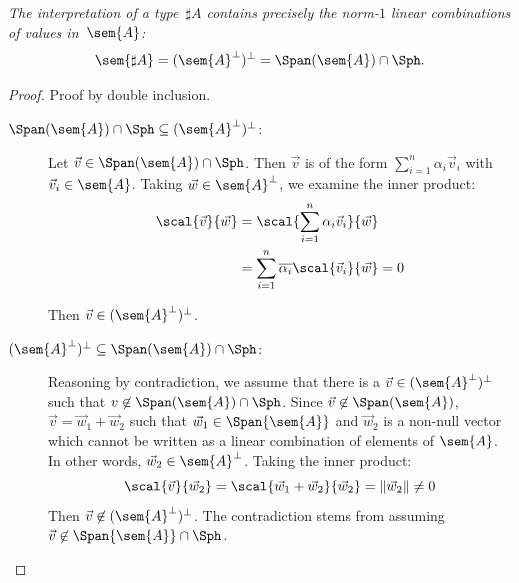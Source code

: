 \begin{restatetheorem}
  \itshape
  The interpretation of a type~$\sharp A$ contains precisely the
  norm-$1$ linear combinations of values in~$\sem{A}$:
  \[
    \sem{\sharp A}
    = (\sem{A}^\bot)^\bot
    = \Span(\sem{A}) \cap \Sph.
  \]
\end{restatetheorem}
\begin{proof}
  Proof by double inclusion.
  \begin{description}
    \item[$\Span(\sem{A})\cap\Sph\subseteq (\sem{A}^\bot)^\bot$:] Let $\vec{v}\in\Span(\sem{A})\cap\Sph$. Then $\vec{v}$ is of the form $\sum_{i=1}^{n}\alpha_i \vec{v}_{i}$ with $\vec{v}_{i}\in\sem{A}$. Taking $\vec{w}\in\sem{A}^\bot$, we examine the inner product:
    \begin{align*}
    \scal{\vec{v}}{\vec{w}} &= \scal{\sum_{i=1}^{n}\alpha_i \vec{v}_{i}}{\vec{w}}\\
    &= \sum_{i=1}^{n}\overline{\alpha_i}\scal{\vec{v}_{i}}{\vec{w}}=0
    \end{align*}

    Then $\vec{v}\in(\sem{A}^\bot)^\bot$.

    \item[$(\sem{A}^\bot)^\bot\subseteq \Span(\sem{A})\cap\Sph$:] Reasoning by contradiction, we assume that there is a $\vec{v}\in(\sem{A}^\bot)^\bot$ such that $v\not\in\Span(\sem{A})\cap\Sph$. Since $\vec{v}\not\in\Span(\sem{A})$, $\vec{v}=\vec{w}_{1} + \vec{w}_{2}$ such that $\vec{w}_{1}\in\Span{\sem{A}}$ and $\vec{w}_{2}$ is a non-null vector which cannot be written as a linear combination of elements of $\sem{A}$. In other words, $\vec{w}_{2}\in\sem{A}^\bot$. Taking the inner product:
    \[
    \scal{\vec{v}}{\vec{w}_{2}} = \scal{\vec{w}_{1}+\vec{w}_{2}}{\vec{w}_{2}} = \|\vec{w}_{2}\|\neq 0
    \]
    Then $\vec{v}\not\in(\sem{A}^\bot)^\bot$. The contradiction stems from assuming $\vec{v}\not\in\Span{\sem{A}}\cap\Sph$.\qedhere
  \end{description}
\end{proof}

